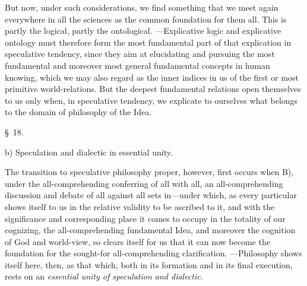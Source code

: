 \documentclass[12pt,a4paper]{book}
\begin{document}
But now, under such considerations, we find something that we meet again everywhere
in all the sciences as the common foundation for them all. This is partly the
logical, partly the ontological. ---Explicative logic and explicative ontology must
therefore form the most fundamental part of that explication in speculative
tendency, since they aim at elucidating and pursuing the most fundamental and
moreover most general fundamental concepts in human knowing, which we may also
regard as the inner indices in us of the first or most primitive world-relations.
But the deepest fundamental relations open themselves to us only when, in speculative
tendency, we explicate to ourselves what belongs to the domain of philosophy of the
Idea.

\begin{center}\large\S~18.\end{center}
\begin{center}b) Speculation and dialectic in essential unity.\end{center}

The transition to speculative philosophy proper, however, first occurs when B),
under the all-comprehending conferring of all with all, an all-comprehending
discussion and debate of all against all sets in---under which, as every particular
shows itself to us in the relative validity to be ascribed to it, and with the
significance and corresponding place it comes to occupy in the totality of our
cognizing, the all-comprehending fundamental Idea, and moreover the cognition of God
and world-view, so clears itself for us that it can now become the foundation for
the sought-for all-comprehending clarification. ---Philosophy shows itself here,
then, as that which, both in its formation and in its final execution, rests on an
\emph{essential unity of speculation and dialectic}.
\end{document}
